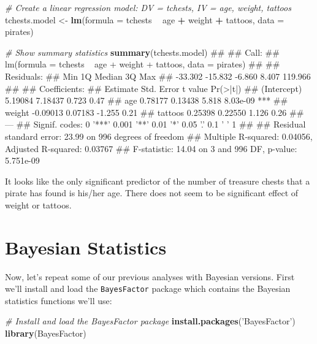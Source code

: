 \documentclass[]{book}
\newenvironment{Shaded}{\begin{snugshade}}{\end{snugshade}}
\newcommand{\KeywordTok}[1]{\textcolor[rgb]{0.13,0.29,0.53}{\textbf{#1}}}
\newcommand{\DataTypeTok}[1]{\textcolor[rgb]{0.13,0.29,0.53}{#1}}
\newcommand{\StringTok}[1]{\textcolor[rgb]{0.31,0.60,0.02}{#1}}
\newcommand{\CommentTok}[1]{\textcolor[rgb]{0.56,0.35,0.01}{\textit{#1}}}
\newcommand{\OperatorTok}[1]{\textcolor[rgb]{0.81,0.36,0.00}{\textbf{#1}}}
\newcommand{\NormalTok}[1]{#1}
\theoremstyle{definition}
\theoremstyle{definition}
\theoremstyle{remark}
\begin{document}
\begin{Shaded}
\begin{Highlighting}[]
\CommentTok{# Create a linear regression model: DV = tchests, IV = age, weight, tattoos}
\NormalTok{tchests.model <-}\StringTok{ }\KeywordTok{lm}\NormalTok{(}\DataTypeTok{formula =}\NormalTok{ tchests }\OperatorTok{~}\StringTok{ }\NormalTok{age }\OperatorTok{+}\StringTok{ }\NormalTok{weight }\OperatorTok{+}\StringTok{ }\NormalTok{tattoos,}
                    \DataTypeTok{data =}\NormalTok{ pirates)}

\CommentTok{# Show summary statistics}
\KeywordTok{summary}\NormalTok{(tchests.model)}
\NormalTok{## }
\NormalTok{## Call:}
\NormalTok{## lm(formula = tchests ~ age + weight + tattoos, data = pirates)}
\NormalTok{## }
\NormalTok{## Residuals:}
\NormalTok{##     Min      1Q  Median      3Q     Max }
\NormalTok{## -33.302 -15.832  -6.860   8.407 119.966 }
\NormalTok{## }
\NormalTok{## Coefficients:}
\NormalTok{##             Estimate Std. Error t value Pr(>|t|)    }
\NormalTok{## (Intercept)  5.19084    7.18437   0.723     0.47    }
\NormalTok{## age          0.78177    0.13438   5.818 8.03e-09 ***}
\NormalTok{## weight      -0.09013    0.07183  -1.255     0.21    }
\NormalTok{## tattoos      0.25398    0.22550   1.126     0.26    }
\NormalTok{## ---}
\NormalTok{## Signif. codes:  0 '***' 0.001 '**' 0.01 '*' 0.05 '.' 0.1 ' ' 1}
\NormalTok{## }
\NormalTok{## Residual standard error: 23.99 on 996 degrees of freedom}
\NormalTok{## Multiple R-squared:  0.04056,    Adjusted R-squared:  0.03767 }
\NormalTok{## F-statistic: 14.04 on 3 and 996 DF,  p-value: 5.751e-09}
\end{Highlighting}
\end{Shaded}

It looks like the only significant predictor of the number of treasure
chests that a pirate has found is his/her age. There does not seem to be
significant effect of weight or tattoos.

\section{Bayesian Statistics}\label{bayesian-statistics}

Now, let's repeat some of our previous analyses with Bayesian versions.
First we'll install and load the \texttt{BayesFactor} package which
contains the Bayesian statistics functions we'll use:

\begin{Shaded}
\begin{Highlighting}[]
\CommentTok{# Install and load the BayesFactor package}
\KeywordTok{install.packages}\NormalTok{(}\StringTok{'BayesFactor'}\NormalTok{)}
\KeywordTok{library}\NormalTok{(BayesFactor)}
\end{Highlighting}
\end{Shaded}
\end{document}
